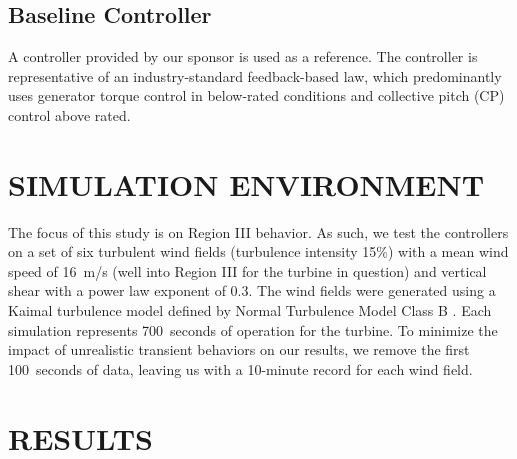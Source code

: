 \documentclass[letterpaper, 10 pt, conference]{ieeeconf}  %
\begin{document}
\subsection{Baseline Controller}

A controller provided by our sponsor is used as a reference. The controller is representative of an industry-standard feedback-based law, which predominantly uses generator torque control in below-rated conditions and collective pitch (CP) control above rated. 


\section{SIMULATION ENVIRONMENT}\label{sec:SimEnv}

The focus of this study is on Region III behavior. As such, we test the controllers on a set of six turbulent wind fields (turbulence intensity 15\%) with a mean wind speed of 16~m/s (well into Region III for the turbine in question) and vertical shear with a power law exponent of 0.3. The wind fields were generated using a Kaimal turbulence model defined by Normal Turbulence Model Class B \cite{Jonkman2009}. Each simulation represents 700~seconds of operation for the turbine. To minimize the impact of unrealistic transient behaviors on our results, we remove the first 100~seconds of data, leaving us with a 10-minute record for each wind field.

\section{RESULTS}\label{sec:Results}
\end{document}
